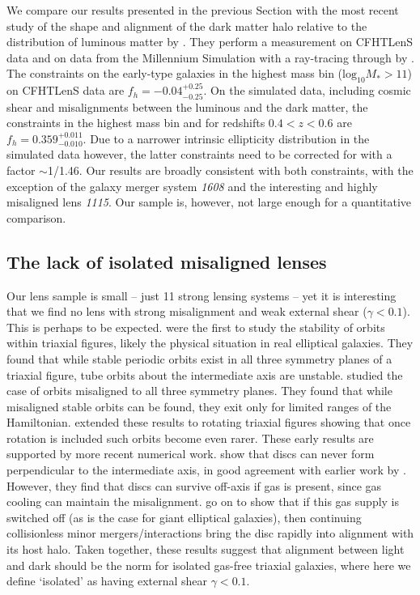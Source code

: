 \documentclass[useAMS,usenatbib]{mn2e}
\begin{document}
We compare our results presented in the previous Section with the most recent study of the shape and alignment of the dark matter halo relative to the distribution of luminous matter by \citet{2015arXiv150704301S}. They perform a measurement on CFHTLenS data and on data from the Millennium Simulation \citep{2005Natur.435..629S} with a ray-tracing through by \citet{2009A&A...499...31H}. The constraints on the early-type galaxies in the highest mass bin ($\mathrm{log_{10}}M_{*}>11$) on CFHTLenS data are $f_{h}=-0.04^{+0.25}_{-0.25}$. On the simulated data, including cosmic shear and misalignments between the luminous and the dark matter, the constraints in the highest mass bin and for redshifts $0.4<z<0.6$ are $f_{h} = 0.359^{+0.011}_{-0.010}$. Due to a narrower intrinsic ellipticity distribution in the simulated data however, the latter constraints need to be corrected for with a factor $\sim$1/1.46. Our results are broadly consistent with both constraints, with the exception of the galaxy merger system \textit{1608} and the interesting and highly misaligned lens \textit{1115}. Our sample is, however, not large enough for a quantitative comparison.

\subsection{The lack of isolated misaligned lenses}
Our lens sample is small -- just 11 strong lensing systems -- yet it is interesting that we find no lens with strong misalignment and weak external shear ($\gamma < 0.1$). This is perhaps to be expected. \citet{1979ApJ...233..872H} were the first to study the stability of orbits within triaxial figures, likely the physical situation in real elliptical galaxies. They found that while stable periodic orbits exist in all three symmetry planes of a triaxial figure, tube orbits about the intermediate axis are unstable. \citet{1985MNRAS.215..731D} studied the case of orbits misaligned to all three symmetry planes. They found that while misaligned stable orbits can be found, they exit only for limited ranges of the Hamiltonian. \citet{1988A&A...206..269M} extended these results to rotating triaxial figures showing that once rotation is included such orbits become even rarer. These early results are supported by more recent numerical work. \citet{2013MNRAS.434.2971D} show that discs can never form perpendicular to the intermediate axis, in good agreement with earlier work by \citet{1979ApJ...233..872H}. However, they find that discs can survive off-axis if gas is present, since gas cooling can maintain the misalignment. \citet{2015MNRAS.452.4094D} go on to show that if this gas supply is switched off (as is the case for giant elliptical galaxies), then continuing collisionless minor mergers/interactions bring the disc rapidly into alignment with its host halo. Taken together, these results suggest that alignment between light and dark should be the norm for isolated gas-free triaxial galaxies, where here we define `isolated' as having external shear $\gamma < 0.1$.
\end{document}
